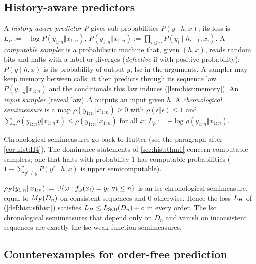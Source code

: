 \subsection{History-aware predictors}\label{sec:hist:setting}

\begin{definition}\label{def:hist:predictor}
A \emph{history-aware predictor} $P$ gives sub-probabilities $P(y\mid h,x)$; its loss is $L_P:=-\log P(y_{1:n}\Vert x_{1:n})$, $P(y_{1:n}\Vert x_{1:n}):=\prod_{i\le n}P(y_i\mid h_{i-1},x_i)$. A \emph{computable sampler} is a probabilistic machine that, given $(h,x)$, reads random bits and halts with a label or diverges (\emph{defective} if with positive probability); $P(y\mid h,x)$ is its probability of output $y$, lsc in the arguments. A sampler may keep memory between calls; it then predicts through its sequence law $P(y_{1:n}\Vert x_{1:n})$ and the conditionals this law induces (\cref{lem:hist:memory}). An \emph{input sampler} (reveal law) $\Delta$ outputs an input given $h$. A \emph{chronological semimeasure} is a map $\rho(y_{1:n}\Vert x_{1:n})\ge0$ with $\rho(\epsilon\Vert\epsilon)\le1$ and $\sum_y\rho(y_{1:n}y\Vert x_{1:n}x)\le\rho(y_{1:n}\Vert x_{1:n})$ for all $x$; $L_\rho:=-\log\rho(y_{1:n}\Vert x_{1:n})$.
\end{definition}

Chronological semimeasures go back to Hutter (see the paragraph after \cref{cor:hist:H4}). The dominance statements of \cref{sec:hist:thm1} concern computable samplers; one that halts with probability $1$ has computable probabilities ($1-\sum_{y'\ne y}P(y'\mid h,x)$ is upper semicomputable).

\begin{lemma}\label{lem:hist:chrono}
$\rho_F(y_{1:n}\Vert x_{1:n}):=\mathbb{U}\{\omega:f_\omega(x_i)=y_i\ \forall i\le n\}$ is an lsc chronological semimeasure, equal to $M_{F}(D_n)$ on consistent sequences and $0$ otherwise. Hence the loss $L_{H}$ of \SFIhist{} (\cref{def:hist:sfihist}) satisfies $L_{H}\le L_{\mathrm{SOI}}(D_n)+c$ in every order. The lsc chronological semimeasures that depend only on $D_n$ and vanish on inconsistent sequences are exactly the lsc weak function semimeasures.
\end{lemma}

\subsection{Counterexamples for order-free prediction}\label{sec:hist:counter}

